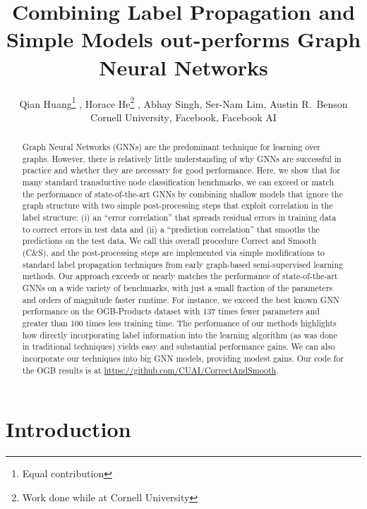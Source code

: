 \documentclass{article}
\title{Combining Label Propagation and Simple Models out-performs Graph Neural Networks}
\author{Qian Huang\textsuperscript{}\thanks{Equal contribution}  , Horace He\thanks{Work done while at Cornell University}\hspace{0.1em} \printfnsymbol{1} , Abhay Singh\textsuperscript{}, Ser-Nam Lim\textsuperscript{}, Austin R.~Benson\textsuperscript{}\\
Cornell University\textsuperscript{}, Facebook\printfnsymbol{2}, Facebook AI\textsuperscript{}\\
}
\newcommand{\framework}{C\&S}
\begin{document}
\maketitle

\begin{abstract}
Graph Neural Networks (GNNs) are the predominant technique for learning over graphs.
However, there is relatively little understanding of why GNNs are successful in practice and whether they are necessary for good performance.
Here, we show that for many standard transductive node classification benchmarks, we can exceed or match
the performance of state-of-the-art GNNs by combining shallow models that ignore the graph structure 
with two simple post-processing steps that exploit correlation in the label structure:
(i)  an ``error correlation'' that spreads residual errors in training data to correct errors in test data and
(ii) a ``prediction correlation'' that smooths the predictions on the test data.
We call this overall procedure Correct and Smooth (\framework{}),
and the post-processing steps are implemented via simple modifications to standard label propagation techniques from early graph-based semi-supervised learning methods.
Our approach exceeds or nearly matches the performance of state-of-the-art GNNs on a wide variety of benchmarks,
with just a small fraction of the parameters and orders of magnitude faster runtime.
For instance, we exceed the best known GNN performance on the OGB-Products dataset with 137 times fewer parameters
and greater than 100 times less training time.
The performance of our methods highlights how directly incorporating label information into the learning algorithm (as was done in traditional techniques)
yields easy and substantial performance gains.
We can also incorporate our techniques into big GNN models, providing modest gains.
Our code for the OGB results is at \url{https://github.com/CUAI/CorrectAndSmooth}.
\end{abstract}

\section{Introduction}
\end{document}
